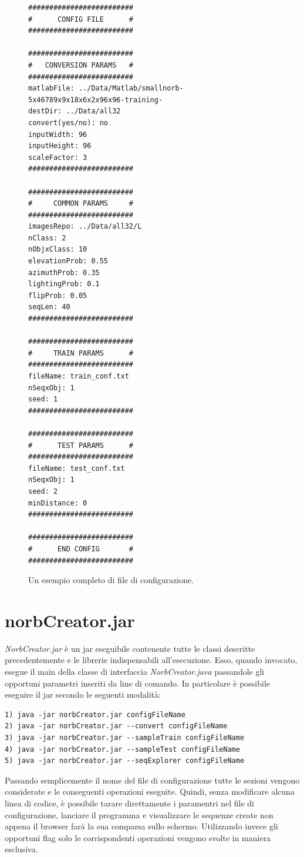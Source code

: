 \documentclass[paper=a4, fontsize=11pt]{scrartcl} %
\numberwithin{equation}{section} %
\numberwithin{figure}{section} %
\numberwithin{table}{section} %
\begin{document}
\begin{figure}[H]
\label{img:configfile}
\centering
\begin{BVerbatim}
#########################
#      CONFIG FILE      #
#########################

#########################
#   CONVERSION PARAMS   #
#########################
matlabFile: ../Data/Matlab/smallnorb-5x46789x9x18x6x2x96x96-training-
destDir: ../Data/all32
convert(yes/no): no
inputWidth: 96
inputHeight: 96
scaleFactor: 3
#########################

#########################
#     COMMON PARAMS     #
#########################
imagesRepo: ../Data/all32/L
nClass: 2
nObjxClass: 10
elevationProb: 0.55
azimuthProb: 0.35
lightingProb: 0.1
flipProb: 0.05
seqLen: 40
#########################

#########################
#     TRAIN PARAMS      #
#########################
fileName: train_conf.txt
nSeqxObj: 1
seed: 1
#########################

#########################
#      TEST PARAMS      #
#########################
fileName: test_conf.txt
nSeqxObj: 1
seed: 2
minDistance: 0
#########################

#########################
#      END CONFIG       #
#########################

\end{BVerbatim}
\caption{Un esempio completo di file di configurazione.}
\end{figure}

\section{norbCreator.jar}
\emph{NorbCreator.jar} è un jar eseguibile contenente tutte le classi descritte precedentemente e le librerie indispensabili all'esecuzione.  Esso, quando invocato, esegue il main della classe di interfaccia \emph{NorbCreator.java} passandole gli opportuni parametri inseriti da line di comando. 
In particolare è possibile eseguire il jar secondo le seguenti modalità:

\begin{lstlisting}
1) java -jar norbCreator.jar configFileName
2) java -jar norbCreator.jar --convert configFileName
3) java -jar norbCreator.jar --sampleTrain configFileName
4) java -jar norbCreator.jar --sampleTest configFileName
5) java -jar norbCreator.jar --seqExplorer configFileName
\end{lstlisting}

Passando semplicemente il nome del file di configurazione tutte le sezioni vengono considerate e le conseguenti operazioni eseguite. Quindi, senza modificare alcuna linea di codice, è possibile tarare direttamente i paramentri nel file di configurazione, lanciare il programma e visualizzare le sequenze create non appena il browser farà la sua comparsa sullo schermo. 
Utilizzando invece gli opportuni flag solo le corrispondenti operazioni vengono svolte in maniera esclusiva.
\end{document}
